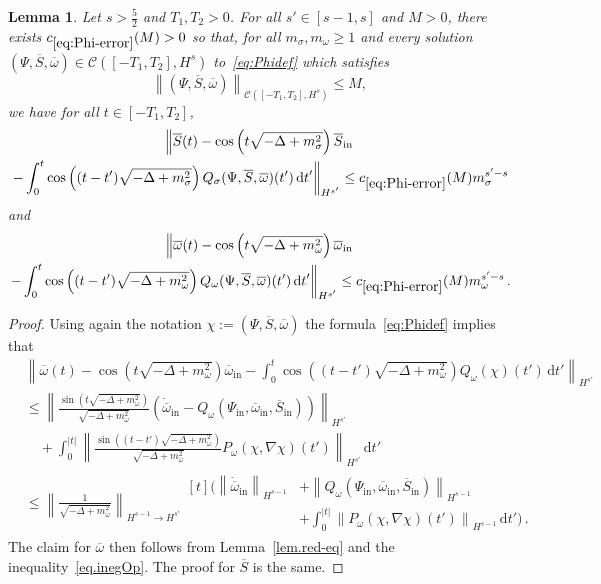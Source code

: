 \documentclass[10pt]{amsart}
\newtheorem{lemm}[theo]{Lemma}\newtheorem{prop}[theo]{Proposition}\newtheorem{coro}[theo]{Corollary}\newtheorem{conj}[theo]{Conjecture}
\theoremstyle{definition}\newtheorem{defi}[theo]{Definition}\newtheorem{rema}[theo]{Remark}\newtheorem{exam}[theo]{Example}\newtheorem{exem}[theo]{Example}\newtheorem{nota}[theo]{Notation}
\newcommand{\rmin}{\mathrm{in}}
\newcommand{\cC}{\mathcal{C}}
\renewcommand\d[1]{{\ensuremath{\,\text{d}#1}}}
\begin{document}
\begin{lemm}\label{lem:Phi-error}
Let $s>\tfrac52$ and $T_1,T_2>0$. For all $s'\in[s-1,s]$ and $M>0$, there exists $c_{\eqref{eq:Phi-error}}(M)>0$ so that, for all $m_\sigma, m_\omega\geq 1$ and every solution $(\Psi, \overline{S}, \overline{\omega})\in\cC([-T_1,T_2],H^s)$ to~\eqref{eq:Phidef} which satisfies
\begin{equation*}
\left\|(\Psi, \overline{S}, \overline{\omega})\right\|_{\cC\left([-T_1,T_2],H^s\right)}\leq M,
\end{equation*}
we have for all $t\in [-T_1,T_2]$,
\begin{multline}\label{eq:Phi-error}
\left\|\overline{S}(t) - \cos\left(t\sqrt{-\Delta + m^2_\sigma}\right)\overline{S}_\rmin\right.\\
\left. - \int_0^t\cos\left((t-t')\sqrt{-\Delta + m^2_\sigma}\right) Q_\sigma(\Psi, \overline{S}, \overline{\omega})(t')\d t'\right\|_{H^{s'}}
\leq c_{\eqref{eq:Phi-error}}(M)m_\sigma^{s'-s}\\
\end{multline}
and
\begin{multline*}
\left\|\overline{\omega}(t)-\cos\left(t\sqrt{-\Delta + m^2_\omega}\right)\overline\omega_\rmin\right.\\
\left. - \int_0^t\cos\left((t-t')\sqrt{-\Delta + m^2_\omega}\right) Q_\omega(\Psi, \overline{S}, \overline{\omega})(t')\d t'\right\|_{H^{s'}}
\leq c_{\eqref{eq:Phi-error}}(M)m_\omega^{s'-s}\,.
\end{multline*}
\end{lemm}

\begin{proof}
Using again the notation $\chi:=(\Psi, \overline{S}, \overline{\omega})$ the formula~\eqref{eq:Phidef} implies that
\begin{align*}
&\left\|\overline{\omega}(t)-\cos\left(t\sqrt{-\Delta + m^2_\omega}\right)\overline\omega_\rmin - \int_0^t\cos\left((t-t')\sqrt{-\Delta + m^2_\omega}\right) Q_\omega(\chi)(t')\d t'\right\|_{H^{s'}}\\
&\leq
\left\|
\frac{\sin\left(t\sqrt{-\Delta + m^2_\omega}\right)}{\sqrt{-\Delta + m^2_\omega}}\left(\dot{\overline{\omega}}_\rmin- Q_\omega(\Psi_\rmin, \overline{\omega}_\rmin, \overline{S}_\rmin)\right)\right\|_{H^{s'}}\\
&\quad+
\int_0^{|t|}
\left\|
\frac{\sin\left((t-t')\sqrt{-\Delta + m^2_\omega}\right)}{\sqrt{-\Delta + m^2_\omega}}P_\omega(\chi, \nabla \chi)(t')
\right\|_{H^{s'}}
\d t' \\
&\leq
\left\|\frac{1}{\sqrt{-\Delta+m_\omega^2}}\right\|_{H^{s-1}\to H^{s'}}
\begin{aligned}[t]\Bigg(
\left\|
\dot{\overline{\omega}}_\rmin\right\|_{H^{s-1}} &+\left\|Q_\omega(\Psi_\rmin, \overline{\omega}_\rmin, \overline{S}_\rmin)\right\|_{{H}^{s-1}}\\
&+\int_0^{|t|}
\left\|P_\omega(\chi, \nabla \chi)(t')\right\|_{H^{s-1}}
\d t'
\Bigg)\,.
\end{aligned}
\end{align*}
The claim for $\overline{\omega}$ then follows from Lemma~\ref{lem.red-eq} and the inequality~\eqref{eq.inegOp}. The proof for $\overline{S}$ is the same.
\end{proof}
\end{document}
